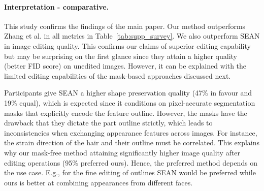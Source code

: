 \documentclass[10pt, conference, compsocconf]{IEEEtran}
\begin{document}
\begin{table*}
\begin{center}
\end{center}
\caption{\textbf{Survey results}. We compare 4 different aspects with other methods. The first one is the editing image quality. The second one is part disentanglement. The third one is identity preservation while changing expression. The last one is shape preservation while changing appearance.}
\label{tab:supp_survey}
\end{table*}

\paragraph{Interpretation - comparative.} This study confirms the findings of the main paper. Our method outperforms Zhang et al. in all metrics in Table~\ref{tab:supp_survey}. We also outperform SEAN in image editing quality. This confirms our claims of superior editing capability but may be surprising on the first glance since they attain a higher quality (better FID score) on unedited images. However, it can be explained with the limited editing capabilities of the mask-based approaches discussed next.

Participants give SEAN a higher shape preservation quality (47\% in favour and 19\% equal), which is expected since it conditions on pixel-accurate segmentation masks that explicitly encode the feature outline. However, the masks have the drawback that they dictate the part outline strictly, which leads to inconsistencies when exchanging appearance features across images. For instance, the strain direction of the hair and their outline must be correlated. This explains why our mask-free method attaining significantly higher image quality after editing operations (95\% preferred ours). Hence, the preferred method depends on the use case. E.g., for the fine editing of outlines SEAN would be preferred while ours is better at combining appearances from different faces. 
\end{document}
